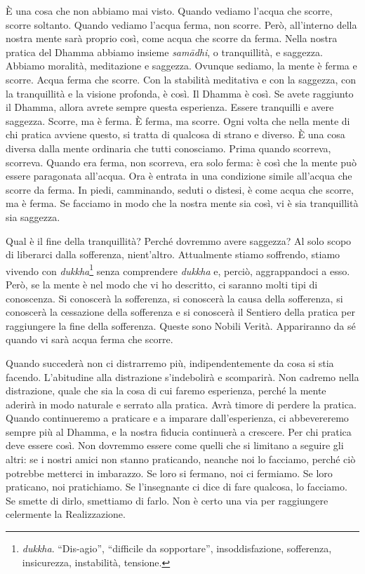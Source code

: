 È una cosa che non abbiamo mai visto. Quando vediamo l'acqua che scorre,
scorre soltanto. Quando vediamo l'acqua ferma, non scorre. Però,
all'interno della nostra mente sarà proprio così, come acqua che scorre
da ferma. Nella nostra pratica del Dhamma abbiamo insieme
\emph{samādhi}, o tranquillità, e saggezza. Abbiamo moralità,
meditazione e saggezza. Ovunque sediamo, la mente è ferma e scorre.
Acqua ferma che scorre. Con la stabilità meditativa e con la saggezza,
con la tranquillità e la visione profonda, è così. Il Dhamma è così. Se
avete raggiunto il Dhamma, allora avrete sempre questa esperienza.
Essere tranquilli e avere saggezza. Scorre, ma è ferma. È ferma, ma
scorre. Ogni volta che nella mente di chi pratica avviene questo, si
tratta di qualcosa di strano e diverso. È una cosa diversa dalla mente
ordinaria che tutti conosciamo. Prima quando scorreva, scorreva. Quando
era ferma, non scorreva, era solo ferma: è così che la mente può essere
paragonata all'acqua. Ora è entrata in una condizione simile all'acqua
che scorre da ferma. In piedi, camminando, seduti o distesi, è come
acqua che scorre, ma è ferma. Se facciamo in modo che la nostra mente
sia così, vi è sia tranquillità sia saggezza.

Qual è il fine della tranquillità? Perché dovremmo avere saggezza? Al
solo scopo di liberarci dalla sofferenza, nient'altro. Attualmente
stiamo soffrendo, stiamo vivendo con \emph{dukkha}\footnote{\emph{dukkha}.
  ``Dis-agio'', ``difficile da sopportare'', insoddisfazione,
  sofferenza, insicurezza, instabilità, tensione.} senza comprendere
\emph{dukkha} e, perciò, aggrappandoci a esso. Però, se la mente è nel
modo che vi ho descritto, ci saranno molti tipi di conoscenza. Si
conoscerà la sofferenza, si conoscerà la causa della sofferenza, si
conoscerà la cessazione della sofferenza e si conoscerà il Sentiero
della pratica per raggiungere la fine della sofferenza. Queste sono
Nobili Verità. Appariranno da sé quando vi sarà acqua ferma che scorre.

Quando succederà non ci distrarremo più, indipendentemente da cosa si
stia facendo. L'abitudine alla distrazione s'indebolirà e scomparirà.
Non cadremo nella distrazione, quale che sia la cosa di cui faremo
esperienza, perché la mente aderirà in modo naturale e serrato alla
pratica. Avrà timore di perdere la pratica. Quando continueremo a
praticare e a imparare dall'esperienza, ci abbevereremo sempre più al
Dhamma, e la nostra fiducia continuerà a crescere. Per chi pratica deve
essere così. Non dovremmo essere come quelli che si limitano a seguire
gli altri: se i nostri amici non stanno praticando, neanche noi lo
facciamo, perché ciò potrebbe metterci in imbarazzo. Se loro si fermano,
noi ci fermiamo. Se loro praticano, noi pratichiamo. Se l'insegnante ci
dice di fare qualcosa, lo facciamo. Se smette di dirlo, smettiamo di
farlo. Non è certo una via per raggiungere celermente la Realizzazione.

